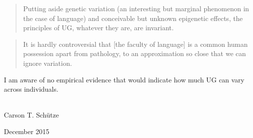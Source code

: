 \begin{refsection}
\begin{quote}
Putting aside genetic variation (an interesting but marginal phenomenon in the case of language) and conceivable but unknown epigenetic effects, the principles of UG, whatever they are, are invariant. \citep[35]{Chomsky2013}
\end{quote}

\begin{quote}
It is hardly controversial that [the faculty of language] is a common human possession apart from pathology, to an approximation so close that we can ignore variation. \citep[138]{Chomsky2008}
\end{quote}

\noindent I am aware of no empirical evidence that would indicate how much UG can vary across individuals.\\\\
\begin{minipage}{.45\linewidth}
	\begin{flushleft}
		\noindent Carson T. Schütze 
	\end{flushleft}
\end{minipage}
\begin{minipage}{.54\linewidth}
	\begin{flushright}
		\noindent December 2015
	\end{flushright}
\end{minipage}
\nocite{Phillips2006}
\printbibliography[heading=prefacebib]
\end{refsection}
